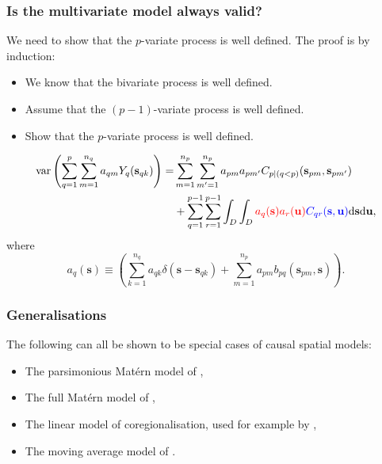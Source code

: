 \documentclass{beamer}
\newcommand{\intd} {\mathrm{d}}
\newcommand{\svec} {\textbf{s}}
\newcommand{\uvec} {\textbf{u}}
\newcommand{\var}{\mathrm{var}}
\newcommand{\red}{\textcolor{red}}%
\newcommand{\blue}{\textcolor{blue}}
\begin{document}
\begin{frame}
\frametitle{Is the multivariate model always valid?}

We need to show that the $p$-variate process is well defined. The proof is by induction:
\begin{itemize}
  \item We know that the bivariate process is well defined.
  \item Assume that the $(p-1)$-variate process is well defined.
  \item Show that the $p$-variate process is well defined.
\end{itemize}

\vspace{-0.3in}
\begin{align*}
\var\left(\sum_{q=1}^p \sum_{m=1}^{n_q} a_{qm}Y_q(\svec_{qk})\right)=& \sum_{m=1}^{n_p}\sum_{m'=1}^{n_p}a_{pm}a_{pm'}C_{p \mid  (q < p)}(\svec_{pm},\svec_{pm'}) \\
&+ \sum_{q=1}^{p-1}\sum_{r=1}^{p-1}\int_D\int_D\red{a_q(\svec)a_r(\uvec)}\blue{C_{qr}(\svec,\uvec)}\intd \svec \intd \uvec, 
\end{align*}
where
\begin{equation*}
a_q(\svec) \equiv \left(\sum_{k=1}^{n_q}a_{qk}\delta(\svec - \svec_{qk}) + \sum_{m=1}^{n_p}a_{pm}b_{pq}(\svec_{pm},\svec)\right).
\end{equation*}
\end{frame}


\begin{frame}
\frametitle{Generalisations}

The following can all be shown to be special cases of causal spatial models:

\begin{itemize}
\item The parsimonious Mat{\'e}rn model of \cite{Gneitingetal2010},
\item The full Mat{\'e}rn model of \cite{Gneitingetal2010},
\item The linear model of coregionalisation, used for example by \cite{Wackernagel1995},
\item The moving average model of \cite{verHoef_1998}.
\end{itemize}
\end{frame}

\end{document}
